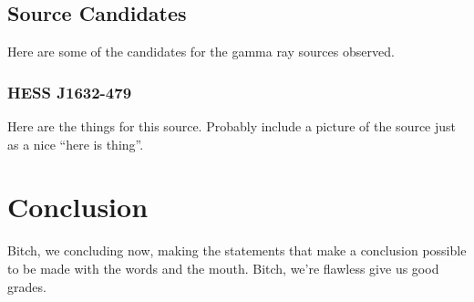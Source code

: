 \documentclass[a4paper, titlepage, oneside]{article}
\begin{document}
\begin{multicols}{2}
\subsection{Source Candidates}
Here are some of the candidates for the gamma ray sources observed.

\subsubsection{HESS J1632-479}
Here are the things for this source. Probably include a picture of the source just as a nice ``here is thing''.

\section{Conclusion}
Bitch, we concluding now, making the statements that make a conclusion possible to be made with the words and the mouth. Bitch, we're flawless give us good grades.
\end{multicols}

\printbibliography[heading=bibintoc]
\end{document}

